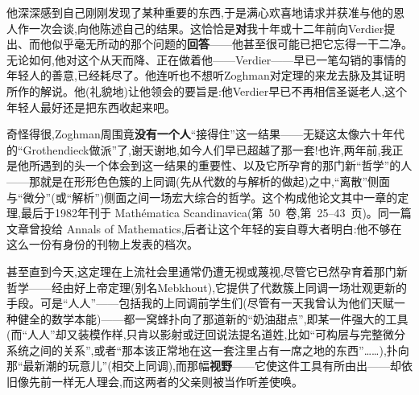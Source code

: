 \noindent 他深深感到自己刚刚发现了某种重要的东西,于是满心欢喜地请求并获准与他的恩人作一次会谈,向他陈述自己的结果。这恰恰是\textbf{对}我十年或十二年前向Verdier提出、而他似乎毫无所动的那个问题的\textbf{回答}——他甚至很可能已把它忘得一干二净。无论如何,他对这个从天而降、正在做着他——Verdier——早已一笔勾销的事情的年轻人的善意,已经耗尽了。他连听也不想听Zoghman对定理的来龙去脉及其证明所作的解说。他(礼貌地)让他领会的要旨是:他Verdier早已不再相信圣诞老人,这个年轻人最好还是把东西收起来吧。

\noindent 奇怪得很,Zoghman周围竟\textbf{没有一个人}“接得住”这一结果——无疑这太像六十年代的“Grothendieck做派”了\dmark{},谢天谢地,如今人们早已超越了那一套!也许,两年前,我正是他所遇到的头一个体会到这一结果的重要性、以及它所孕育的那门新“哲学”的人——那就是在形形色色簇的上同调(先从代数的与解析的做起)之中,“离散”侧面与“微分”(或“解析”)侧面之间一场宏大综合的哲学。这个构成他论文其中一章的定理,最后于1982年刊于 Mathématica Scandinavica(第~50~卷,第~25--43~页)。同一篇文章曾投给 Annals of Mathematics,后者让这个年轻的妄自尊大者明白:他不够在这么一份有身份的刊物上发表的档次。

\noindent 甚至直到今天,这定理在上流社会里通常仍遭无视或蔑视,尽管它已然孕育着那门新哲学——经由好上帝定理(别名Mebkhout),它提供了代数簇上同调一场壮观更新的手段。可是“人人”——包括我的上同调前学生们(尽管有一天我曾认为他们天赋一种健全的数学本能)——都一窝蜂扑向了那道新的“奶油甜点”,即某一件强大的工具(而“人人”却又装模作样,只肯以影射或迂回说法提名道姓,比如“可构层与完整微分系统之间的关系”,或者“那本该正常地在这一套注里占有一席之地的东西”……),扑向那“最新潮的玩意儿”(相交上同调),而\dmark{}那幅\textbf{视野}——它使这件工具有所由出——却依旧像先前一样无人理会,而这两者的父亲则被当作听差使唤。

